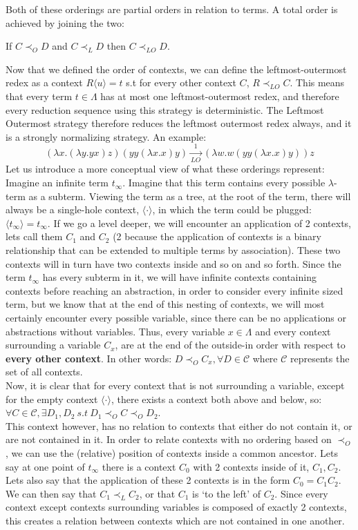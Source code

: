 \documentclass[11pt]{article}
\begin{document}
Both of these orderings are partial orders in relation to terms. A total order is achieved by joining the two:
\begin{center}
  If $C \prec_{O} D$ and $C \prec_{L} D$ then $C \prec_{LO} D$.
\end{center}
Now that we defined the order of contexts, we can define the leftmost-outermost redex as a context $R\langle u \rangle = t$ s.t for every other context $C$, $R \prec_{LO} C$. 
This means that every term $t \in \Lambda$ has at most one leftmost-outermost redex, and therefore every reduction sequence using this strategy is deterministic. The Leftmost Outermost strategy therefore reduces the leftmost outermost redex always, and it is a strongly normalizing strategy. An example:
\begin{equation*}
  (\lambda x . (\lambda y . y x) z) (y y (\lambda x . x) y) \xrightarrow[LO]{1} (\lambda w . w (y y (\lambda x . x) y )) z
\end{equation*}
Let us introduce a more conceptual view of what these orderings represent: Imagine an infinite term $t_\infty$. Imagine that this term contains every possible $\lambda$-term as a subterm. Viewing the term as a tree, at the root of the term, there will always be a single-hole context, $\langle \cdot \rangle$, in which the term could be plugged: $\langle t_\infty \rangle = t_\infty$. If we go a level deeper, we will encounter an application of 2 contexts, lets call them $C_1$ and $C_2$ (2 because the application of contexts is a binary relationship that can be extended to multiple terms by association). These two contexts will in turn have two contexts inside and so on and so forth. Since the term $t_\infty$ has every subterm in it, we will have infinite contexts containing contexts before reaching an abstraction, in order to consider every infinite sized term, but we know that at the end of this nesting of contexts, we will most certainly encounter every possible variable, since there can be no applications or abstractions without variables. Thus, every variable $x \in \Lambda$ and every context surrounding a variable $C_x$, are at the end of the outside-in order with respect to \textbf{every other context}. In other words: $D \prec_O C_x , \forall D \in \mathcal{C}$ where $\mathcal{C}$ represents the set of all contexts. \\
Now, it is clear that for every context that is not surrounding a variable, except for the empty context $\langle \cdot \rangle$, there exists a context both above and below, so: $\forall C \in \mathcal{C}, \exists D_1, D_2 \ s.t \ D_1 \prec_O C \prec_O D_2$. \\ This context however, has no relation to contexts that either do not contain it, or are not contained in it. In order to relate contexts with no ordering based on $\prec_O$, we can use the (relative) position of contexts inside a common ancestor. Lets say at one point of $t_\infty$ there is a context $C_0$ with 2 contexts inside of it, $C_1,C_2$. Lets also say that the application of these 2 contexts is in the form $C_0 = C_1C_2$. We can then say that $C_1 \prec_L C_2$, or that $C_1$ is \enquote*{to the left} of $C_2$. Since every context except contexts surrounding variables is composed of exactly 2 contexts, this creates a relation between contexts which are not contained in one another.
\end{document}
